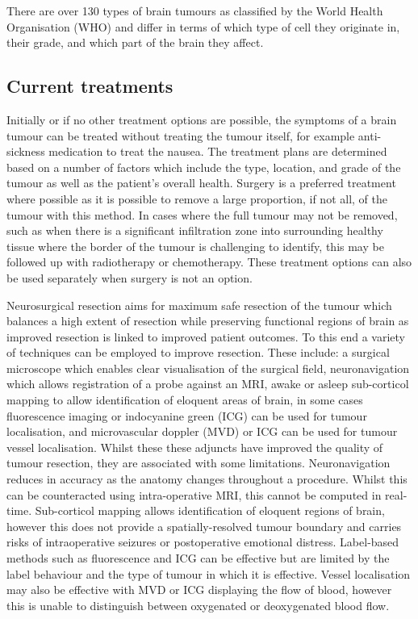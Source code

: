 There are over 130 types of brain tumours as classified by the World Health Organisation (WHO) and differ in terms of which type of cell they originate in, their grade, and which part of the brain they affect.

\subsection{Current treatments}\label{sec:introtumourtreatments}
Initially or if no other treatment options are possible, the symptoms of a brain tumour can be treated without treating the tumour itself, for example anti-sickness medication to treat the nausea. The treatment plans are determined based on a number of factors which include the type, location, and grade of the tumour as well as the patient's overall health\cite{NationalHealthService2023}. Surgery is a preferred treatment where possible as it is possible to remove a large proportion, if not all, of the tumour with this method. In cases where the full tumour may not be removed, such as when there is a significant infiltration zone into surrounding healthy tissue where the border of the tumour is challenging to identify, this may be followed up with radiotherapy or chemotherapy. These treatment options can also be used separately when surgery is not an option.\cite{MacmillanCancerSupport2019} 

Neurosurgical resection aims for maximum safe resection of the tumour which balances a high extent of resection while preserving functional regions of brain as improved resection is linked to improved patient outcomes\cite{Chanbour2022}. To this end a variety of techniques can be employed to improve resection. These include: a surgical microscope which enables clear visualisation of the surgical field, neuronavigation which allows registration of a probe against an MRI, awake or asleep sub-corticol mapping to allow identification of eloquent areas of brain, in some cases fluorescence imaging or indocyanine green (ICG) can be used for tumour localisation, and microvascular doppler (MVD) or ICG can be used for tumour vessel localisation\cite{Chanbour2022, Catapano2018}. Whilst these these adjuncts have improved the quality of tumour resection, they are associated with some limitations\cite{Chanbour2022}. Neuronavigation reduces in accuracy as the anatomy changes throughout a procedure. Whilst this can be counteracted using intra-operative MRI, this cannot be computed in real-time\cite{Chanbour2022}. Sub-corticol mapping allows identification of eloquent regions of brain, however this does not provide a spatially-resolved tumour boundary and carries risks of intraoperative seizures or postoperative emotional distress\cite{Chanbour2022}. Label-based methods such as fluorescence and ICG can be effective but are limited by the label behaviour and the type of tumour in which it is effective\cite{Chanbour2022}. Vessel localisation may also be effective with MVD or ICG displaying the flow of blood, however this is unable to distinguish between oxygenated or deoxygenated blood flow. 

